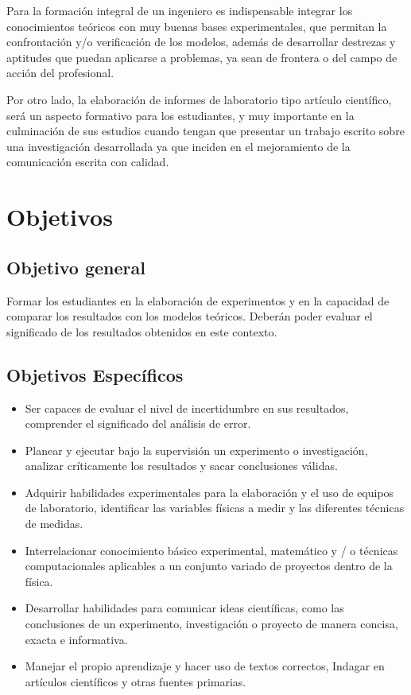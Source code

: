 \documentclass[12pt]{article}
\begin{document}
Para la formación integral de un ingeniero es indispensable integrar los conocimientos teóricos con muy buenas bases experimentales, que permitan la confrontación y/o verificación de los modelos, además de desarrollar destrezas y aptitudes que puedan aplicarse a problemas, ya sean de frontera o del campo de acción del profesional. 

Por otro lado, la elaboración de informes de laboratorio tipo artículo científico, será un aspecto formativo para los estudiantes, y muy importante en la culminación de sus estudios cuando tengan que presentar un trabajo escrito sobre una investigación desarrollada ya que inciden en el mejoramiento de la comunicación escrita con calidad.

\newpage


\section{Objetivos}

\subsection*{Objetivo general}

Formar los estudiantes en la elaboración de experimentos y en la capacidad de comparar los resultados con los modelos teóricos. Deberán poder evaluar el significado de los resultados obtenidos en este contexto.

\subsection*{Objetivos Específicos}

\begin{itemize}
    \item Ser capaces de evaluar el nivel de incertidumbre en sus resultados, comprender el significado del análisis de error.
    \item Planear y ejecutar bajo la supervisión un experimento o investigación, analizar críticamente los resultados y sacar conclusiones válidas.
    \item Adquirir habilidades experimentales para la elaboración y el uso de equipos de laboratorio, identificar las variables físicas a medir y las diferentes técnicas de medidas.
    \item Interrelacionar conocimiento básico experimental, matemático y / o técnicas computacionales aplicables a un conjunto variado de proyectos dentro de la física.
    \item Desarrollar habilidades para comunicar ideas científicas, como las conclusiones de un experimento, investigación o proyecto de manera concisa, exacta e informativa.
    \item Manejar el propio aprendizaje y hacer uso de textos correctos, Indagar en artículos científicos y otras fuentes primarias. 
\end{itemize}
\end{document}
